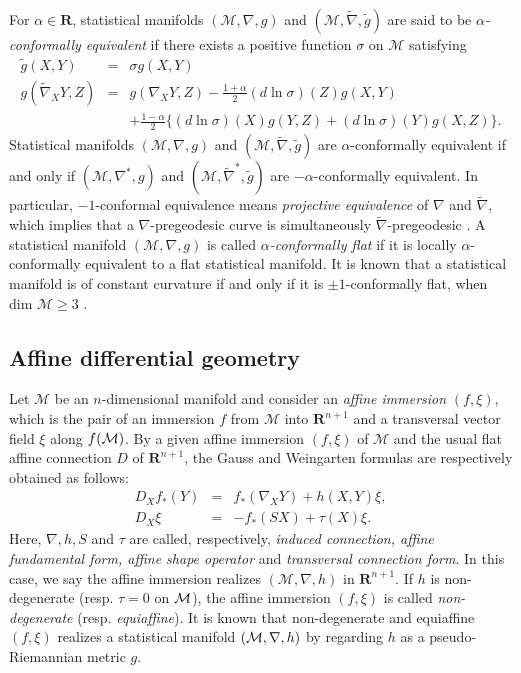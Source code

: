 \documentclass{llncs}
\begin{document}
For $\alpha \in \mathbf{R}$, statistical manifolds 
$(\mathcal{M},\nabla,g)$ and $(\mathcal{M},\tilde \nabla ,\tilde g)$ 
are said to be
{\em $\alpha$-conformally equivalent} \cite{Kurose94}
if there exists a positive function $\sigma$ on $\mathcal{M}$ satisfying
\begin{eqnarray*}
  \tilde g(X,Y)&=&\sigma g(X,Y) 
\label{conf_eq1} \\
 g( \tilde \nabla_X Y,Z)&=&g(\nabla_X Y,Z)
	-\frac{1+\alpha}{2}(d \ln \sigma)(Z)g(X,Y) \nonumber \\
 && +\frac{1-\alpha}{2}\{(d\ln \sigma)(X)g(Y,Z)+(d\ln \sigma)(Y)g(X,Z)\}.
\label{conf_eq2}
\end{eqnarray*}
Statistical manifolds $(\mathcal{M},\nabla,g)$ and 
$(\mathcal{M},\tilde \nabla, \tilde g)$ are $\alpha$-conformally
equivalent if and only if $(\mathcal{M},\nabla^*,g)$ and 
$(\mathcal{M},{\tilde \nabla}^*,\tilde g)$ are 
$-\alpha$-conformally equivalent.
In particular, $-1$-conformal equivalence means 
{\em projective equivalence} of $\nabla$ and $\tilde \nabla$, 
which implies that a $\nabla$-pregeodesic curve is 
simultaneously $\tilde \nabla$-pregeodesic \cite{NS}.
A statistical manifold $(\mathcal{M},\nabla,g)$ is called
{\em $\alpha$-conformally flat} if it is locally
$\alpha$-conformally equivalent to a flat statistical manifold.
It is known that a statistical manifold is of constant curvature 
if and only if it is $\pm 1$-conformally flat,
when dim $\mathcal{M} \ge 3$ \cite{Kurose94}.

\subsection{Affine differential geometry}
Let $\mathcal{M}$ be an $n$-dimensional manifold and consider 
an {\em affine immersion} \cite{NS} $(f,\xi)$, which is the pair of 
an immersion $f$ from $\mathcal{M}$ into $\mathbf{R}^{n+1}$ and a
transversal vector field $\xi$ along $f({\cal M})$. 
By a given affine immersion $(f,\xi)$ of $\mathcal{M}$ and the usual
flat affine connection $D$ of $\mathbf{R}^{n+1}$, the Gauss and Weingarten
formulas are respectively obtained as follows:
\begin{eqnarray*}
 D_Xf_*(Y) &=& f_*(\nabla_X Y) + h(X,Y)\xi, \\
 D_X \xi &=&- f_*(SX) + \tau(X) \xi.
\end{eqnarray*}
Here, $\nabla, h, S$ and $\tau$ are called, respectively, 
{\em induced connection, affine fundamental form, affine shape operator} 
and {\em transversal connection form}.
In this case, we say the affine immersion realizes
$(\mathcal{M},\nabla,h)$ in $\mathbf{R}^{n+1}$.
If $h$ is non-degenerate (resp. $\tau=0$ on ${\cal M}$), 
the affine immersion $(f, \xi)$ is called 
{\em non-degenerate} (resp. {\em equiaffine}).
It is known that non-degenerate and equiaffine $(f,\xi)$ realizes  
a statistical manifold $({\cal M},\nabla,h)$ by regarding 
$h$ as a pseudo-Riemannian metric $g$.
\end{document}
